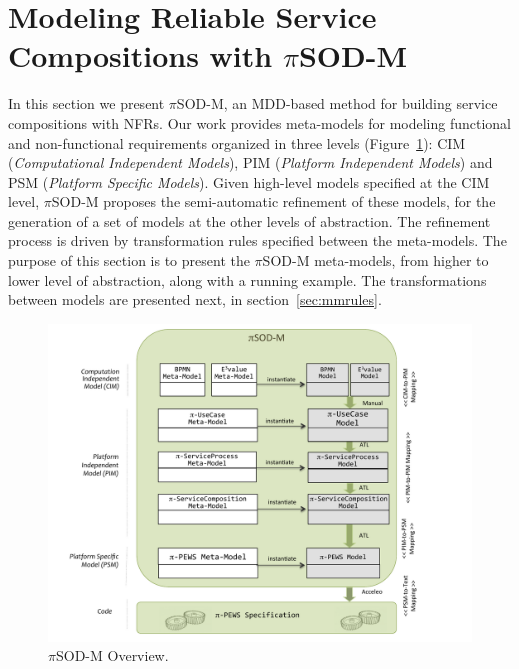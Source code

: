 \documentclass{singlecol-new}
\theoremstyle{TH}{
\newtheorem{lemma}{Lemma}
\newtheorem{theorem}[lemma]{Theorem}
\newtheorem{corrolary}[lemma]{Corrolary}
\newtheorem{conjecture}[lemma]{Conjecture}
\newtheorem{proposition}[lemma]{Proposition}
\newtheorem{claim}[lemma]{Claim}
\newtheorem{stheorem}[lemma]{Wrong Theorem}
\newtheorem{algorithm}{Algorithm}
}
\theoremstyle{THrm}{
\newtheorem{definition}{Definition}[section]
\newtheorem{question}{Question}[section]
\newtheorem{remark}{Remark}
\newtheorem{scheme}{Scheme}
}
\theoremstyle{THhit}{
\newtheorem{case}{Case}[section]
}
\theoremstyle{THhsl}{
\newtheorem{example}{Example}
}
\newcommand{\pisodm}[0]{$\pi$SOD-M\xspace}
\begin{document}
\section{Modeling Reliable Service Compositions with \pisodm}\label{sec:motivation}

In this section we present \pisodm, an MDD-based method for building service compositions with NFRs.
Our work provides meta-models for modeling functional and non-functional requirements organized in three levels (Figure~\ref{fig:piSOD-M}): CIM (\textit{Computational Independent Models}), PIM (\textit{Plat\-form Independent Models}) and PSM (\textit{Platform Specific Models}).
Given  high-level models specified at the CIM level, \pisodm proposes the semi-automatic refinement of these models, for the generation of a set of models at the other levels of abstraction.
The refinement process is driven by transformation rules specified between the meta-models.
%
The purpose of this section is to present the \pisodm me\-ta-models, from higher to lower level of abstraction, along with a running example.
The transformations between models are presented next, in section~\ref{sec:mmrules}.

\begin{figure}[h]
\centering
\includegraphics[width=1\textwidth]{./figures/piSOD-M_process.pdf}
\caption{\pisodm Overview.}
\label{fig:piSOD-M}
\end{figure}
\end{document}
